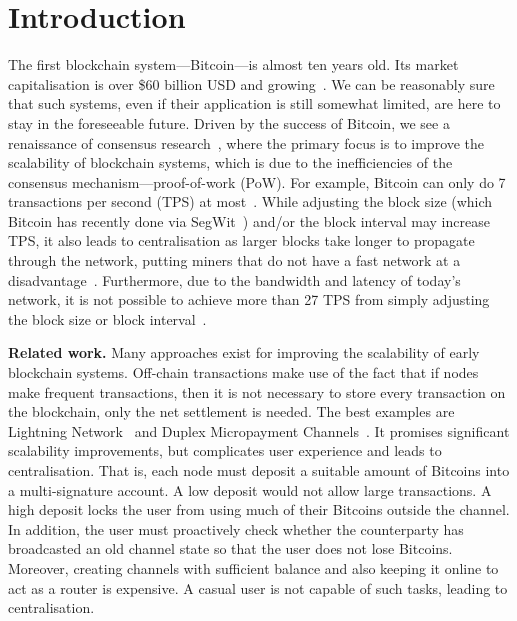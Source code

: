 \section{Introduction}

The first blockchain system---Bitcoin---is almost ten years old. 
Its market capitalisation is over \$60 billion USD and growing~\cite{bitcoinmarketcap}.
We can be reasonably sure that such systems,
even if their application is still somewhat limited,
are here to stay in the foreseeable future.
Driven by the success of Bitcoin, we see a renaissance of consensus research~\cite{luu2016elastico, kogias2016enhancing, kokoris2017omniledger},
where the primary focus is to improve the scalability of blockchain systems,
which is due to the inefficiencies of the consensus mechanism---proof-of-work (PoW).
For example, Bitcoin can only do 7 transactions per second (TPS) at most~\cite{vukolic2015quest}.
While adjusting the block size (which Bitcoin has recently done via SegWit~\cite{segwit}) and/or the block interval may increase TPS,
it also leads to centralisation as larger blocks take longer to propagate through the network,
putting miners that do not have a fast network at a disadvantage~\cite{croman2016scaling}.
Furthermore, due to the bandwidth and latency of today's network,
it is not possible to achieve more than 27 TPS from simply adjusting the block size or block interval~\cite{croman2016scaling}.

\textbf{Related work.\quad}
Many approaches exist for improving the scalability of early blockchain systems.
Off-chain transactions make use of the fact that if nodes make frequent transactions,
then it is not necessary to store every transaction on the blockchain,
only the net settlement is needed.
The best examples are Lightning Network~\cite{lightningnetwork} and Duplex Micropayment Channels~\cite{decker2015fast}.
It promises significant scalability improvements, but complicates user experience and leads to centralisation.
That is, each node must deposit a suitable amount of Bitcoins into a multi-signature account.
A low deposit would not allow large transactions.
A high deposit locks the user from using much of their Bitcoins outside the channel.
In addition, the user must proactively check whether the counterparty has broadcasted an old channel state so that the user does not lose Bitcoins.
Moreover, creating channels with sufficient balance and also keeping it online to act as a router is expensive.
A casual user is not capable of such tasks, leading to centralisation.

